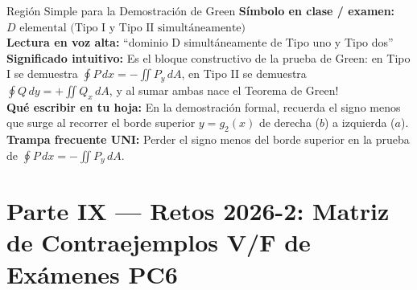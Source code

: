 \documentclass[11pt,a4paper]{article}
\begin{document}
\begin{definicionbox}{Región Simple para la Demostración de Green}
\textbf{Símbolo en clase / examen:} $D \text{ elemental (Tipo I y Tipo II simultáneamente)}$\\[0.15cm]
\textbf{Lectura en voz alta:} ``dominio D simultáneamente de Tipo uno y Tipo dos''\\[0.12cm]
\textbf{Significado intuitivo:} Es el bloque constructivo de la prueba de Green: en Tipo I se demuestra $\oint P\,dx = -\iint P_y\,dA$, en Tipo II se demuestra $\oint Q\,dy = +\iint Q_x\,dA$, y al sumar ambas nace el Teorema de Green!\\[0.12cm]
\textbf{Qué escribir en tu hoja:} En la demostración formal, recuerda el signo menos que surge al recorrer el borde superior $y = g_2(x)$ de derecha ($b$) a izquierda ($a$).\\[0.12cm]
\textbf{Trampa frecuente UNI:} Perder el signo menos del borde superior en la prueba de $\oint P\,dx = -\iint P_y\,dA$.
\end{definicionbox}


\newpage
\part*{Parte IX --- Retos 2026-2: Matriz de Contraejemplos V/F de Exámenes PC6}
\end{document}
